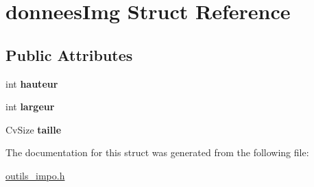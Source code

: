 \hypertarget{structdonneesImg}{\section{donnees\-Img Struct Reference}
\label{structdonneesImg}
}
\subsection*{Public Attributes}
\begin{DoxyCompactItemize}
\item 
\hypertarget{structdonneesImg_aaeecaf2b85d5d21f80fcbc9369f84b40}{int {\bfseries hauteur}}\label{structdonneesImg_aaeecaf2b85d5d21f80fcbc9369f84b40}

\item 
\hypertarget{structdonneesImg_aac90cc090e5b2f4bbf136fb7ad53b88f}{int {\bfseries largeur}}\label{structdonneesImg_aac90cc090e5b2f4bbf136fb7ad53b88f}

\item 
\hypertarget{structdonneesImg_aaae8951bd6883e4361908edceeb17837}{Cv\-Size {\bfseries taille}}\label{structdonneesImg_aaae8951bd6883e4361908edceeb17837}

\end{DoxyCompactItemize}


The documentation for this struct was generated from the following file\-:\begin{DoxyCompactItemize}
\item 
\hyperlink{outils__impo_8h}{outils\-\_\-impo.\-h}\end{DoxyCompactItemize}
